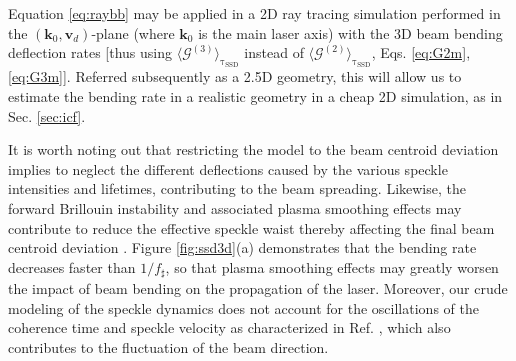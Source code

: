 \documentclass[%
 reprint,
 amsmath,amssymb,
 aps,
]{revtex4-1}
\begin{document}
Equation \eqref{eq:raybb} may   be applied in a 2D ray tracing simulation performed in the $(\mathbf{k}_0,\mathbf{v}_d)$-plane (where $\mathbf{k}_0$ is the main laser axis) with the 3D beam bending deflection rates [thus using  $  \langle  \mathcal{G}^{(3)}\rangle_\mathrm{\tau_\mathrm{SSD}}$ instead of  $  \langle  \mathcal{G}^{(2)}\rangle_\mathrm{\tau_\mathrm{SSD}}$, Eqs. \eqref{eq:G2m}, \eqref{eq:G3m}]. Referred subsequently as a 2.5D geometry, this will allow us to estimate the bending rate in a realistic geometry in a cheap 2D simulation, as in Sec. \ref{sec:icf}. 
%

It is worth noting out that restricting the model to the  beam centroid deviation implies to neglect the  different deflections caused by  the various speckle intensities  and lifetimes,  contributing to the beam spreading. Likewise, the forward Brillouin instability \cite[]{POP_Grech_2006,PRL_Grech_2009,phd-Grech} and associated plasma smoothing effects may contribute to reduce the effective speckle waist thereby affecting the final beam centroid deviation \cite[]{POP_Maximov_2001}.
Figure \ref{fig:ssd3d}(a) demonstrates that the  bending rate decreases faster than $1/f_\sharp$, so that plasma smoothing effects may greatly worsen the impact of beam bending on the propagation of the laser.
Moreover, our crude modeling of the speckle dynamics does not  account for the oscillations of the coherence time and speckle velocity  as characterized in Ref. \cite[]{POP_Cain_Riazuelo_2012}, which also contributes to the fluctuation  of the beam direction.
\end{document}
